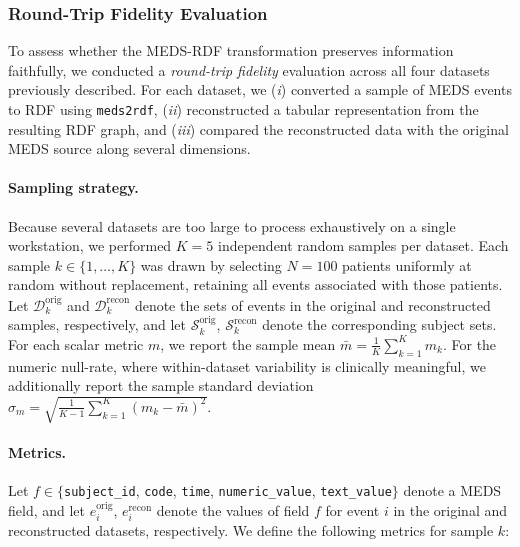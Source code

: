 \subsubsection{Round-Trip Fidelity Evaluation}\label{sec:paper3_supp-fidelity}
To assess whether the MEDS-RDF transformation preserves information faithfully, %
we conducted a \emph{round-trip fidelity} evaluation across all four datasets previously described. For each dataset, we (\textit{i}) converted a sample of MEDS events to RDF using \texttt{meds2rdf}, (\textit{ii}) reconstructed a tabular representation from the resulting RDF graph, and (\textit{iii}) compared the reconstructed data with the original MEDS source along several dimensions.

\paragraph{Sampling strategy.}
Because several datasets are too large to process exhaustively on a single workstation, we performed $K = 5$ independent random samples per dataset. Each sample $k \in \{1, \ldots, K\}$ was drawn by selecting $N = 100$ patients uniformly at random without replacement, retaining all events associated with those patients. Let $\mathcal{D}_k^{\text{orig}}$ and $\mathcal{D}_k^{\text{recon}}$ denote the sets of events in the original and reconstructed samples, respectively, and let $\mathcal{S}_k^{\text{orig}}$, $\mathcal{S}_k^{\text{recon}}$ denote the corresponding subject sets. For each scalar metric $m$, we report the sample mean $\bar{m} = \frac{1}{K}\sum_{k=1}^{K} m_k$. For the numeric null-rate, where within-dataset variability is clinically meaningful, we additionally report the sample standard deviation $\sigma_m = \sqrt{\frac{1}{K-1}\sum_{k=1}^{K}(m_k - \bar{m})^2}$.

\paragraph{Metrics.}
Let $f \in \{$\texttt{subject\_id}, \texttt{code}, \texttt{time}, \texttt{numeric\_value}, \texttt{text\_value}$\}$ denote a MEDS field, and let $e_i^{\text{orig}}$, $e_i^{\text{recon}}$ denote the values of field $f$ for event $i$ in the original and reconstructed datasets, respectively. We define the following metrics for sample $k$:

